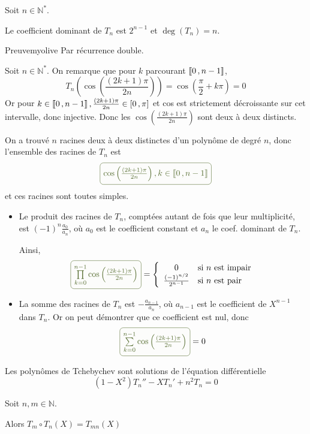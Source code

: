     \begin{prop}{}{}
        Soit $n \in \mathbb{N}^*$.

        Le coefficient dominant de $T_n$ est $2^{n-1}$ et $\deg(T_n) = n$.
    \end{prop}

    \begin{demo}{Preuve}{myolive}
        Par récurrence double.
    \end{demo}

    Soit $n \in \mathbb{N}^*$. On remarque que pour $k$ parcourant $\left\llbracket 0 \, , n-1 \right\rrbracket$, 
    \[ T_n \left(\cos\left(\frac{(2k+1)\pi}{2n}\right)\right) = \cos\left(\frac{\pi}{2} + k\pi\right) = 0 \] 
    Or pour $k \in \left\llbracket 0 \, , n-1 \right\rrbracket, \frac{(2k+1)\pi}{2n} \in \left[ 0 \, , \pi \right]$ et cos est strictement décroissante sur cet intervalle, donc injective. Donc les $\cos \left(\frac{(2k+1)\pi}{2n}\right)$ sont deux à deux distincts. 
    
    On a trouvé $n$ racines deux à deux distinctes d’un polynôme de degré $n$, donc l’ensemble des racines de $T_n$ est \[ \lilbox{myolive}{$\cos\left(\frac{(2k+1)\pi}{2n}\right), k \in \intervalleEntier{0}{n-1}$} \] et ces racines sont toutes simples.

    \begin{itemize}
        \item Le produit des racines de $T_n$, comptées autant de fois que leur multiplicité, est $(-1)^n \frac{a_0}{a_n}$, où $a_0$ est le coefficient constant et $a_n$ le coef. dominant de $T_n$. 
        
        Ainsi,
        \[ \lilbox{myolive}{$ \prod\limits_{k=0}^{n-1} \cos \left( \frac{(2k+1)\pi}{2n}\right) $} = \sisi{0}{n \text{ est impair}}{\frac{(-1)^{n/2}}{2^{n-1}}}{n \text{ est pair}} \] 
        \item La somme des racines de $T_n$ est $-\frac{a_{n-1}}{a_n}$, où $a_{n-1}$ est le coefficient de $X^{n-1}$ dans $T_n$. Or on peut démontrer que ce coefficient est nul, donc 
        \[ \lilbox{myolive}{$ \sum\limits_{k=0}^{n-1} \cos \left( \frac{(2k+1)\pi}{2n}\right) $} = 0 \] 
    \end{itemize}

    \begin{prop}{}{}
        Les polynômes de Tchebychev sont solutions de l’équation différentielle 
        \[ (1-X^2) T_n'' - XT_n' + n^2 T_n = 0 \]
    \end{prop}

    \begin{prop}{}{}
        Soit $n, m \in \mathbb{N}$. 

        Alors $T_m \circ T_n (X) = T_{mn}(X)$
    \end{prop}

